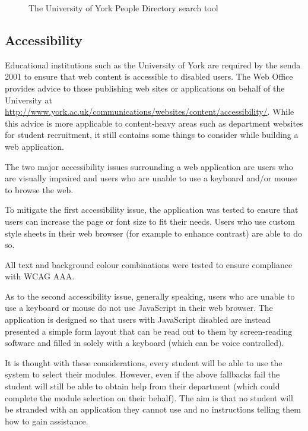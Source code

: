 \documentclass[twoside,draft]{scrartcl}
\begin{document}
\begin{landscape}
\begin{figure}
\begin{minipage}[b]{0.48\linewidth}
      \caption{The University of York People Directory search tool}
      \label{yorkacuk_directory_search}
    \end{minipage}
  \end{figure}
\end{landscape}

\subsection{Accessibility}


Educational institutions such as the University of York are required by the
\gls{senda} 2001 to ensure that web content is accessible to disabled users.
The Web Office provides advice to those publishing web sites or applications
on behalf of the University at
\url{http://www.york.ac.uk/communications/websites/content/accessibility/}.
While this advice is more applicable to content-heavy areas such as department
websites for student recruitment, it still contains some things to consider
while building a web application.


The two major accessibility issues surrounding a web application are users who
are visually impaired and users who are unable to use a keyboard and/or mouse
to browse the web.

To mitigate the first accessibility issue, the application was tested to
ensure that users can increase the page or font size to fit their needs. Users
who use custom style sheets in their web browser (for example to enhance
contrast) are able to do so.

All text and background colour combinations were tested to ensure compliance
with WCAG AAA.


As to the second accessibility issue, generally speaking, users who are unable
to use a keyboard or mouse do not use JavaScript in their web browser. The
application is designed so that users with JavaScript disabled are instead
presented a simple form layout that can be read out to them by screen-reading
software and filled in solely with a keyboard (which can be voice controlled).

It is thought with these considerations, every student will be able to use the
system to select their modules. However, even if the above fallbacks fail the
student will still be able to obtain help from their department (which could
complete the module selection on their behalf). The aim is that no student
will be stranded with an application they cannot use and no instructions
telling them how to gain assistance.
\end{document}
